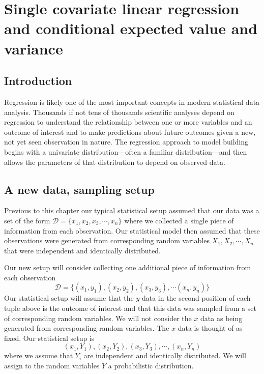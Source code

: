 \chapter{Single covariate linear regression and conditional expected value and variance}
\hspace{1mm}

\section{Introduction}\label{intro}

Regression is likely one of the most important concepts in modern statistical data analysis. 
Thousands if not tens of thousands scientific analyses depend on regression to understand the relationship between one or more variables and an outcome of interest and to make predictions about future outcomes given a new, not yet seen observation in nature.
The regression approach to model building begins with a univariate distribution---often a familiar distribution---and then allows the parameters of that distribution to depend on observed data.

\section{A new data, sampling setup}\label{intro}

Previous to this chapter our typical statistical setup assumed that our data was a set of the form $\mathcal{D} = \{ x_{1},x_{2},x_{3}, \cdots, x_{n} \}$ where we collected a single piece of information from each observation. 
Our statistical model then assumed that these observations were generated from corresponding random variables $X_{1}, X_{2}, \cdots, X_{n}$ that were independent and identically distributed.

Our new setup will consider collecting one additional piece of information from each observation
\begin{equation}
    \mathcal{D} = \{ (x_{1},y_{1}), (x_{2},y_{2}), (x_{3},y_{3}), \cdots (x_{n},y_{n})  \}
\end{equation}
Our statistical setup will assume that the $y$ data in the second position of each tuple above is the outcome of interest and that this data was sampled from a set of corresponding random variables. 
We will not consider the $x$ data as being generated from corresponding random variables. 
The $x$ data is thought of as fixed.
Our statistical setup is 
\begin{equation}
    (x_{1}, Y_{1}),(x_{2}, Y_{2}),(x_{3}, Y_{3}), \cdots, (x_{n}, Y_{n}) 
\end{equation}
where we assume that $Y_{i}$ are independent and identically distributed.
We will assign to the random variables $Y$ a probabilistic distribution.

